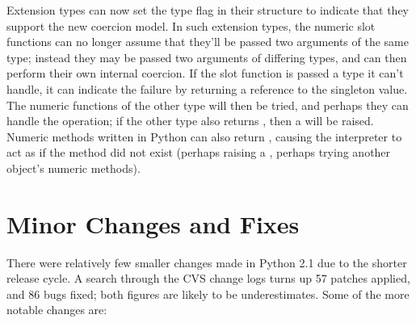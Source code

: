 \documentclass{howto}
\begin{document}
Extension types can now set the type flag
 in their 
structure to indicate that they support the new coercion model.  In
such extension types, the numeric slot functions can no longer assume
that they'll be passed two arguments of the same type; instead they
may be passed two arguments of differing types, and can then perform
their own internal coercion.  If the slot function is passed a type it
can't handle, it can indicate the failure by returning a reference to
the  singleton value.  The numeric functions
of the other type will then be tried, and perhaps they can handle the
operation; if the other type also returns ,
then a  will be raised.  Numeric methods written
in Python can also return , causing the
interpreter to act as if the method did not exist (perhaps raising a
, perhaps trying another object's numeric
methods).

\begin{seealso}


\end{seealso}

\section{Minor Changes and Fixes}

There were relatively few smaller changes made in Python 2.1 due to
the shorter release cycle.  A search through the CVS change logs turns
up 57 patches applied, and 86 bugs fixed; both figures are likely to
be underestimates.  Some of the more notable changes are:
\end{document}
